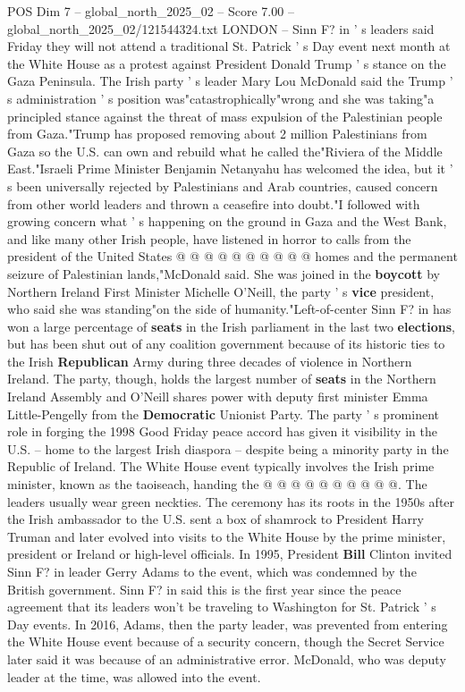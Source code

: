 \begin{textsample}{POS Dim 7 – global\_north\_2025\_02 – Score 7.00 – global\_north\_2025\_02/121544324.txt}  \label{ex:f7_pos_279}
LONDON -- Sinn F? in ' s leaders said Friday they will not attend a traditional St.
Patrick ' s Day event next month at the White House as a protest against President Donald Trump ' s stance on the Gaza Peninsula.
The Irish party ' s leader Mary Lou McDonald said the Trump ' s administration ' s position was"catastrophically"wrong and she was taking"a principled stance against the threat of mass expulsion of the Palestinian people from Gaza."Trump has proposed removing about 2 million Palestinians from Gaza so the U.S. can own and rebuild what he called the"Riviera of the Middle East."Israeli Prime Minister Benjamin Netanyahu has welcomed the idea, but it ' s been universally rejected by Palestinians and Arab countries, caused concern from other world leaders and thrown a ceasefire into doubt."I followed with growing concern what ' s happening on the ground in Gaza and the West Bank, and like many other Irish people, have listened in horror to calls from the president of the United States @ @ @ @ @ @ @ @ @ @ homes and the permanent seizure of Palestinian lands,"McDonald said.
She was joined in the \textbf{boycott} by Northern Ireland First Minister Michelle O'Neill, the party ' s \textbf{vice} president, who said she was standing"on the side of humanity."Left-of-center Sinn F? in has won a large percentage of \textbf{seats} in the Irish parliament in the last two \textbf{elections}, but has been shut out of any coalition government because of its historic ties to the Irish \textbf{Republican} Army during three decades of violence in Northern Ireland.
The party, though, holds the largest number of \textbf{seats} in the Northern Ireland Assembly and O'Neill shares power with deputy first minister Emma Little-Pengelly from the \textbf{Democratic} Unionist Party.
The party ' s prominent role in forging the 1998 Good Friday peace accord has given it visibility in the U.S. -- home to the largest Irish diaspora -- despite being a minority party in the Republic of Ireland.
The White House event typically involves the Irish prime minister, known as the taoiseach, handing the @ @ @ @ @ @ @ @ @ @.
The leaders usually wear green neckties.
The ceremony has its roots in the 1950s after the Irish ambassador to the U.S. sent a box of shamrock to President Harry Truman and later evolved into visits to the White House by the prime minister, president or Ireland or high-level officials.
In 1995, President \textbf{Bill} Clinton invited Sinn F? in leader Gerry Adams to the event, which was condemned by the British government.
Sinn F? in said this is the first year since the peace agreement that its leaders won't be traveling to Washington for St.
Patrick ' s Day events.
In 2016, Adams, then the party leader, was prevented from entering the White House event because of a security concern, though the Secret Service later said it was because of an administrative error.
McDonald, who was deputy leader at the time, was allowed into the event.

\end{textsample}
